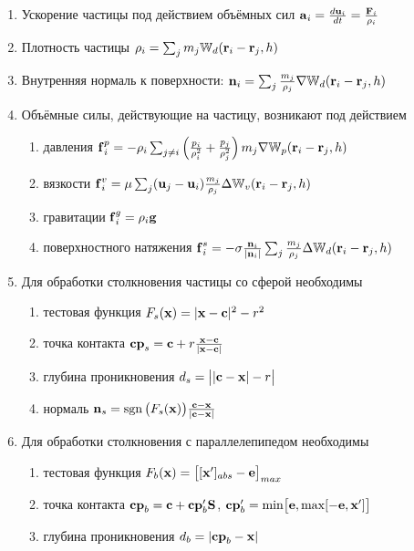 \begin{enumerate}
  \item Ускорение частицы под действием объёмных сил $\boldsymbol{\mathbf{a}}_i=\frac{d\boldsymbol{\mathbf{u}}_i}{dt}=\frac{\boldsymbol{\mathbf{F}}_i}{\rho_i}$
  \item Плотность частицы $\rho_i=\sum_j m_j\mathbb W_d(\boldsymbol{\mathbf{r}}_i-\boldsymbol{\mathbf{r}}_j, h)$
  \item Внутренняя нормаль к поверхности: $\boldsymbol{\mathbf{n}}_i=\sum_j\frac{m_j}{\rho_j}\nabla\mathbb W_d(\boldsymbol{\mathbf{r}}_i-\boldsymbol{\mathbf{r}}_j, h)$
  \item Объёмные силы, действующие на частицу, возникают под действием
    \begin{enumerate}
      \item давления $\boldsymbol{\mathbf{f}}_i^p=-\rho_i\sum_{j\neq i}\left(\frac{p_i}{\rho_i^2}+\frac{p_j}{\rho_j^2}\right)m_j\nabla\mathbb W_p(\boldsymbol{\mathbf{r}}_i-\boldsymbol{\mathbf{r}}_j, h)$
      \item вязкости $\boldsymbol{\mathbf{f}}_i^v=\mu\sum_{j}(\boldsymbol{\mathbf{u}}_j-\boldsymbol{\mathbf{u}}_i)\frac{m_j}{\rho_j}\Delta\mathbb W_v(\boldsymbol{\mathbf{r}}_i-\boldsymbol{\mathbf{r}}_j, h)$
      \item гравитации $\boldsymbol{\mathbf{f}}_i^g=\rho_i\boldsymbol{\mathbf{g}}$
      \item поверхностного натяжения $\boldsymbol{\mathbf{f}}_i^s=-\sigma\frac{\boldsymbol{\mathbf{n}}_i}{|\boldsymbol{\mathbf{n}}_i|} \sum_j\frac{m_j}{\rho_j}\Delta\mathbb W_d(\boldsymbol{\mathbf{r}}_i-\boldsymbol{\mathbf{r}}_j, h)    $
    \end{enumerate}
  \item Для обработки столкновения частицы со сферой необходимы
    \begin{enumerate}
      \item тестовая функция $F_s(\boldsymbol{\mathbf{x}})=|\boldsymbol{\mathbf{x}}-\boldsymbol{\mathbf{c}}|^2-r^2$
      \item точка контакта $\boldsymbol{\mathbf{cp}}_s=\boldsymbol{\mathbf{c}}+r\frac{\boldsymbol{\mathbf{x}}-\boldsymbol{\mathbf{c}}}{|\boldsymbol{\mathbf{x}}-\boldsymbol{\mathbf{c}}|}$
      \item глубина проникновения $d_s=\big||\boldsymbol{\mathbf{c}}-\boldsymbol{\mathbf{x}}|-r\big|$
      \item нормаль $\boldsymbol{\mathbf{n}}_s=\operatorname{sgn}\big(F_s(\boldsymbol{\mathbf{x}})\big)\frac{\boldsymbol{\mathbf{c}}-\boldsymbol{\mathbf{x}}}{|\boldsymbol{\mathbf{c}}-\boldsymbol{\mathbf{x}}|}$
    \end{enumerate}
  \item Для обработки столкновения с параллелепипедом необходимы
    \begin{enumerate}
      \item тестовая функция $F_b(\boldsymbol{\mathbf{x}})=\big[[\boldsymbol{\mathbf{x}}']_{abs}-\boldsymbol{\mathbf{e}}\big]_{max}$
      \item точка контакта $\boldsymbol{\mathbf{cp}}_b=\boldsymbol{\mathbf{c}}+\boldsymbol{\mathbf{cp}}'_b\boldsymbol{\mathbf{S}}$, \quad $\boldsymbol{\mathbf{cp}}'_b=\min\!\big[\boldsymbol{\mathbf{e}}, \max[-\boldsymbol{\mathbf{e}}, \boldsymbol{\mathbf{x}}']\big]$
      \item глубина проникновения $d_b=|\boldsymbol{\mathbf{cp}}_b-\boldsymbol{\mathbf{x}}|$

\end{enumerate}
\end{enumerate}
